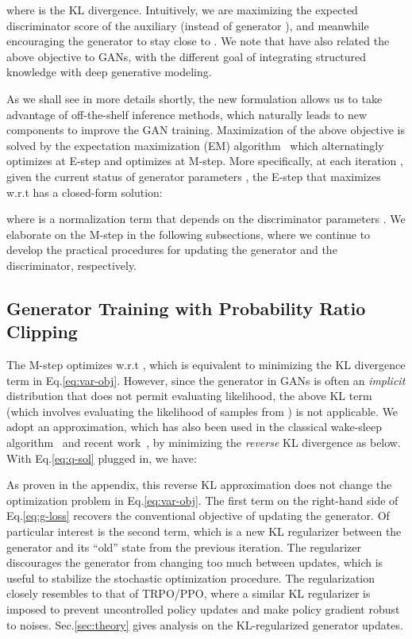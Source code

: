 \documentclass{article}
\newcommand{\0}{\bm{0}}
\begin{document}
where  is the KL divergence.
Intuitively, we are maximizing the expected discriminator score of the auxiliary  (instead of generator ), and meanwhile encouraging the generator to stay close to . We note that \citet{hu2018deep} have also related the above objective to GANs, with the different goal of integrating structured knowledge with deep generative modeling. 

As we shall see in more details shortly, the
new formulation allows us to take advantage of off-the-shelf inference methods, which naturally leads to new components to improve the GAN training. Maximization of the above objective is solved by the expectation maximization (EM) algorithm~\cite{neal1998view} which alternatingly optimizes  at E-step and optimizes  at M-step. More specifically, at each iteration , given the current status of generator parameters , the E-step that maximizes  w.r.t  has a closed-form solution:

where  is a normalization term that  depends on the discriminator parameters .
We elaborate on the M-step in the following subsections, where we continue to develop the practical procedures for updating the generator and the discriminator, respectively.


\subsection{Generator Training with Probability Ratio Clipping}\label{sec:method:gen}

The M-step optimizes  w.r.t , which is equivalent to minimizing the KL divergence term in Eq.\eqref{eq:var-obj}. However, since the generator  in GANs is often an \emph{implicit} distribution that does not permit evaluating likelihood, the above KL term (which involves evaluating the likelihood of samples from ) is not applicable. We adopt an approximation, which has also been used in the classical wake-sleep algorithm~\cite{hinton1995wake} and recent work~\cite{hu2018deep}, by minimizing the \emph{reverse} KL divergence as below. With Eq.\eqref{eq:q-sol} plugged in, we have:

As proven in the appendix, this reverse KL approximation does not change the optimization problem in Eq.\eqref{eq:var-obj}. 
The first term on the right-hand side of Eq.\eqref{eq:g-loss} recovers the conventional objective of updating the generator. Of particular interest is the second term, which is a new KL regularizer between the generator  and its ``old'' state  from the previous iteration. The regularizer discourages the generator from changing too much between updates, which is useful to stabilize the stochastic optimization procedure. The regularization closely resembles to that of TRPO/PPO, where a similar KL regularizer is imposed to prevent uncontrolled policy updates and make policy gradient robust to noises. Sec.\ref{sec:theory} gives  analysis on the KL-regularized generator updates.
\end{document}
